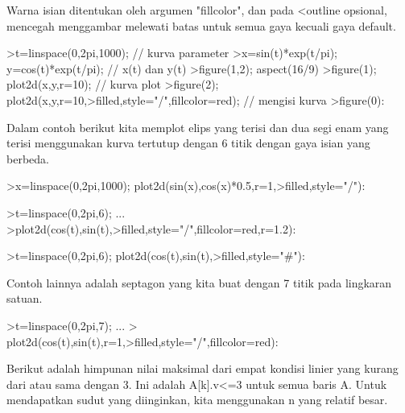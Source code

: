 \documentclass{article}
\begin{document}
\begin{eulernotebook}
\begin{eulercomment}
\begin{eulercomment}
\begin{eulercomment}
\begin{eulercomment}
\begin{eulercomment}
Warna isian ditentukan oleh argumen "fillcolor", dan pada \textless{}outline
opsional, mencegah menggambar melewati batas untuk semua gaya kecuali
gaya default.
\end{eulercomment}
\begin{eulerprompt}
>t=linspace(0,2pi,1000); // kurva parameter
>x=sin(t)*exp(t/pi); y=cos(t)*exp(t/pi); // x(t) dan y(t)
>figure(1,2); aspect(16/9)
>figure(1); plot2d(x,y,r=10); // kurva plot
>figure(2); plot2d(x,y,r=10,>filled,style="/",fillcolor=red); // mengisi kurva
>figure(0):
\end{eulerprompt}
\begin{eulercomment}
Dalam contoh berikut kita memplot elips yang terisi dan dua segi enam
yang terisi menggunakan kurva tertutup dengan 6 titik dengan gaya
isian yang berbeda.
\end{eulercomment}
\begin{eulerprompt}
>x=linspace(0,2pi,1000); plot2d(sin(x),cos(x)*0.5,r=1,>filled,style="/"):
\end{eulerprompt}
\begin{eulerprompt}
>t=linspace(0,2pi,6); ...
>plot2d(cos(t),sin(t),>filled,style="/",fillcolor=red,r=1.2):
\end{eulerprompt}
\begin{eulerprompt}
>t=linspace(0,2pi,6); plot2d(cos(t),sin(t),>filled,style="#"):
\end{eulerprompt}
\begin{eulercomment}
Contoh lainnya adalah septagon yang kita buat dengan 7 titik pada
lingkaran satuan.
\end{eulercomment}
\begin{eulerprompt}
>t=linspace(0,2pi,7);  ...
> plot2d(cos(t),sin(t),r=1,>filled,style="/",fillcolor=red):
\end{eulerprompt}
\begin{eulercomment}
Berikut adalah himpunan nilai maksimal dari empat kondisi linier yang
kurang dari atau sama dengan 3. Ini adalah A[k].v\textless{}=3 untuk semua baris
A. Untuk mendapatkan sudut yang diinginkan, kita menggunakan n yang
relatif besar.
\end{eulercomment}
\begin{eulerprompt}

\end{eulerprompt}
\end{eulercomment}
\end{eulercomment}
\end{eulercomment}
\end{eulercomment}
\end{eulernotebook}
\end{document}
